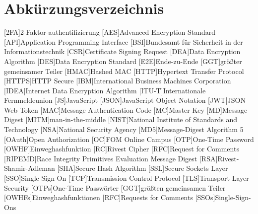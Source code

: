 \section*{Abkürzungsverzeichnis}


\begin{acronym}
	[HTTPS]\itemsep0pt %
    [2FA]{2-Faktor-\gls{authentifizierung}}
    [AES]{Advanced Encryption Standard}
    [API]{Application Programming Interface}
    [BSI]{Bundesamt für Sicherheit in der Informationstechnik}
    [CSR]{Certificate Signing Request}
    [DEA]{Data Encryption Algorithm}
    [DES]{Data Encryption Standard}
    [E2E]{Ende-zu-Ende}
    [GGT]{größter gemeinsamer Teiler}
    [H\acs{MAC}]{Hashed \acl{MAC}}
    [HTTP]{Hypertext Transfer Protocol}\label{acro:HTTP}
    [\acs{HTTP}S]{\acl{HTTP} Secure}
    [IBM]{International Business Machines Corporation}
    [IDEA]{Internet Data Encryption Algorithm}
    [ITU-T]{Internationale Fernmeldeunion}
    [JS]{JavaScript}
    [JSON]{JavaScript Object Notation}\label{acro:JSON}
    [JWT]{\acs{JSON} Web Token}
    [MAC]{Message Authentication Code}\label{acro:MAC}
    [MC]{Master Key}
    [MD]{Message Digest}
    [MITM]{man-in-the-middle}\label{acro:MITM}
    [NIST]{National Institute of Standards and Technology}
    [NSA]{National Security Agency}
    [MD5]{Message-Digest Algorithm 5}\label{acro:MD5}
    [OAuth]{Open Authorization}
    [OC]{FOM Online Campus} 
    [OTP]{One-Time Password}
    [OWHF]{Einweghashfunktion}
    [RC]{Rivest Cipher}
    [RFC]{Request for Comments}
    [RIPEMD]{Race Integrity Primitives Evaluation Message Digest}
    [RSA]{Rivest-Shamir-Adleman}
    [SHA]{Secure Hash Algorithm}
    [SSL]{Secure Sockets Layer}
    [SSO]{Single-Sign-On}
    [TCP]{Transmission Control Protocol}
    [TLS]{Transport Layer Security}
    [OTPs]{One-Time Passwörter}
    [GGT]{größten gemeinsamen Teiler}
    [OWHFs]{Einweghashfunktionen}
    [RFC]{Requests for Comments}
    [SSOs]{Single-Sign-Ons}
\end{acronym}